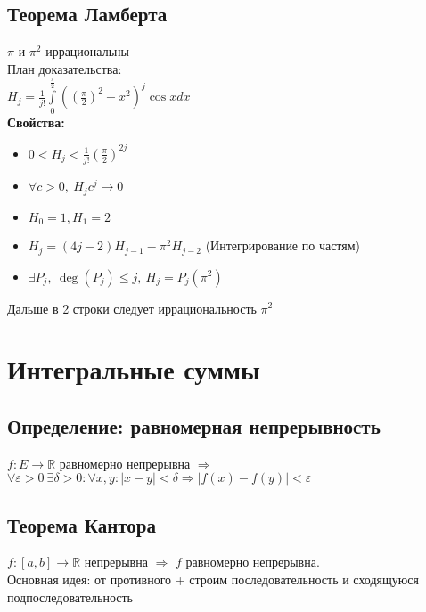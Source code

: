 \documentclass[12pt]{report} %
\begin{document}
\subsection*{\textbf{Теорема Ламберта}}
\begin{spacing}{1.3}
$\pi$ и $\pi^2$ иррациональны\\
План доказательства:\\
$H_{j} = \frac{1}{j!}\displaystyle\int\limits_{0}^{\frac{\pi}{2}}{\left(\left(\frac{\pi}{2}\right)^2 - x^2\right)^j\cos x dx}$\\
\textbf{Свойства:}
\begin{itemize}
  \item $0 < H_j < \frac{1}{j!}\left( {\frac{\pi}{2}}\right)^{2j}$
  \item $\forall c > 0, \ H_jc^j \rightarrow 0$
  \item $H_{0} = 1, H_{1} = 2$
  \item $H_{j} = (4j - 2)H_{j - 1} - \pi^2H_{j - 2}$ (Интегрирование по частям)
  \item $\exists P_j, \ \deg(P_j) \leqslant j, \ H_j = P_j\left(\pi^2  \right)$
\end{itemize}
\end{spacing}
Дальше в 2 строки следует иррациональность $\pi^2$

\section*{Интегральные суммы}

\subsection*{\textbf{Определение: равномерная непрерывность}}
$f : E \rightarrow \mathbb{R}$ равномерно непрерывна $\Rightarrow$ $\forall \varepsilon > 0 \ \exists \delta > 0: 
\forall x, y: |x - y| < \delta \Rightarrow |f(x) - f(y)| < \varepsilon$
\subsection*{\textbf{Теорема Кантора}}
\begin{spacing}{1.3}
$f: [a, b] \rightarrow \mathbb{R}$ непрерывна $\Rightarrow$ $f$ равномерно непрерывна.\\
Основная идея: от противного + строим последовательность и сходящуюся подпоследовательность\\
\end{spacing}
\end{document}
